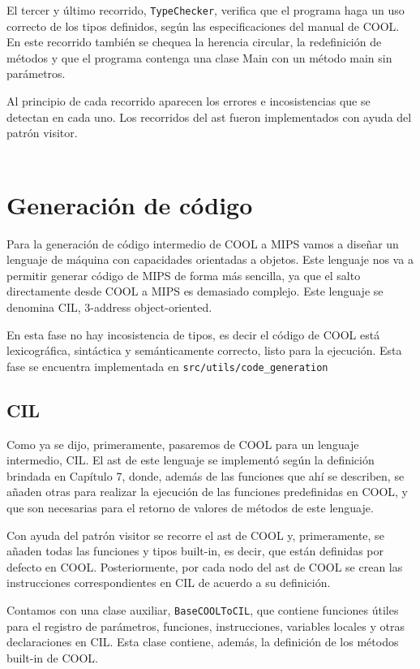 \documentclass[twoside]{article}
\begin{document}
El tercer y \'ultimo recorrido, \texttt{TypeChecker}, verifica que el programa haga un uso correcto de los tipos definidos, seg\'un las especificaciones del manual de COOL. En este recorrido tambi\'en se chequea la herencia circular, la redefinici\'on de m\'etodos y que el programa contenga una clase Main con un m\'etodo main sin par\'ametros. 

Al principio de cada recorrido aparecen los errores e incosistencias que se detectan en cada uno. Los recorridos del ast fueron implementados con ayuda del patr\'on visitor.\\\\


\section{Generaci\'on de c\'odigo}
Para la generaci\'on de c\'odigo intermedio de COOL a MIPS vamos a dise\~nar un lenguaje de m\'aquina con capacidades orientadas a objetos. Este lenguaje nos va a permitir generar c\'odigo de MIPS de forma m\'as sencilla, ya que el salto directamente desde COOL a MIPS es demasiado complejo. Este lenguaje se denomina CIL, 3-address object-oriented.

En esta fase no hay incosistencia de tipos, es decir el c\'odigo de COOL est\'a lexicogr\'afica, sint\'actica y sem\'anticamente correcto, listo para la ejecuci\'on. Esta fase se encuentra implementada en \texttt{src/utils/code\_generation}

\subsection{CIL}
Como ya se dijo, primeramente, pasaremos de COOL para un lenguaje intermedio, CIL. El ast de este lenguaje se implement\'o seg\'un la definici\'on brindada en \cite{compilers} Cap\'itulo 7, donde, adem\'as de las funciones que ah\'i se describen, se a\~naden otras para realizar la ejecuci\'on de las funciones predefinidas en COOL, y que son necesarias para el retorno de valores de m\'etodos de este lenguaje.

Con ayuda del patr\'on visitor se recorre el ast de COOL y, primeramente, se a\~naden todas las funciones y tipos built-in, es decir, que est\'an definidas por defecto en COOL. Posteriormente, por cada nodo del ast de COOL se crean las instrucciones correspondientes en CIL de acuerdo a su definici\'on.

Contamos con una clase auxiliar, \texttt{BaseCOOLToCIL}, que contiene funciones \'utiles para el registro de par\'ametros, funciones, instrucciones, variables locales y otras declaraciones en CIL. Esta clase contiene, adem\'as, la definici\'on de los m\'etodos built-in de COOL.\\
\end{document}
